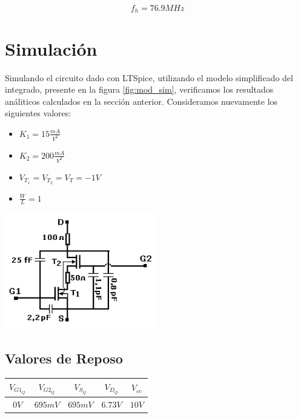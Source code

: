 \documentclass[a4paper, 10pt, spanish]{article}
\begin{document}
\begin{equation}
  f_h=76.9MHz
\end{equation}

\newpage

\section{Simulación}
Simulando el circuito dado con LTSpice, utilizando el modelo simplificado del integrado, presente en la figura \ref{fig:mod_sim}, verificamos los resultados análiticos calculados en la sección anterior. Consideramos nuevamente los siguientes valores:
\begin{itemize}
  \item $K_1=15\frac{mA}{V^2}$
  \item $K_2=200\frac{mA}{V^2}$
  \item $V_{T_1}=V_{T_2}=V_{T}=-1V$
  \item $\frac{W}{L}=1$
\end{itemize}

\begin{center}
  \includegraphics[width=0.5\textwidth]{modelo_simple.png}
  \label{fig:mod_sim}
\end{center}

\subsection{Valores de Reposo}

\begin{center}
  \begin{tabular}{|c|c|c|c|c|}
    \hline
    $V_{G1_Q}$ & $V_{G2_Q}$ & $V_{S_Q}$ & $V_{D_Q}$ & $V_{cc}$ \\
    \hline
    $0V$ & $695mV$ & $695mV$ & $6.73V$ & $10V$ \\
    \hline
  \end{tabular}
  \label{tab:valores_reposo_sim}
\end{center}
\end{document}
